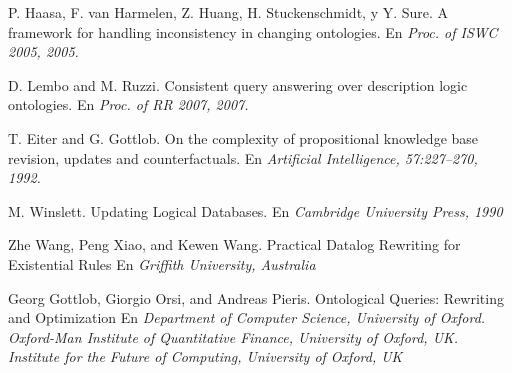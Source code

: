 \documentclass[11pt,a4paper,twoside]{tesis}
\begin{document}
\begin{thebibliography}{9}
    P. Haasa, F. van Harmelen, Z. Huang, H. Stuckenschmidt, y Y. Sure.
    A framework for handling inconsistency in changing ontologies.
    En \textit{Proc. of ISWC 2005, 2005.} 

    D. Lembo and M. Ruzzi.
    Consistent query answering over description logic ontologies.
    En \textit{Proc. of RR 2007, 2007.} 
    
    T. Eiter and G. Gottlob.
    On the complexity of propositional knowledge base revision, updates and counterfactuals.
    En \textit{Artificial Intelligence, 57:227–270, 1992.} 
    
    M. Winslett.
    Updating Logical Databases.
    En \textit{Cambridge University Press, 1990} 
    
    Zhe Wang, Peng Xiao, and Kewen Wang.
    Practical Datalog Rewriting for Existential Rules
    En \textit{Griffith University, Australia} 
    
    Georg Gottlob, Giorgio Orsi, and Andreas Pieris.
    Ontological Queries: Rewriting and Optimization
    En \textit{Department of Computer Science, University of Oxford. Oxford-Man Institute of Quantitative Finance, University of Oxford, UK. Institute for the Future of Computing, University of Oxford, UK } 





    \end{thebibliography}
\end{document}
